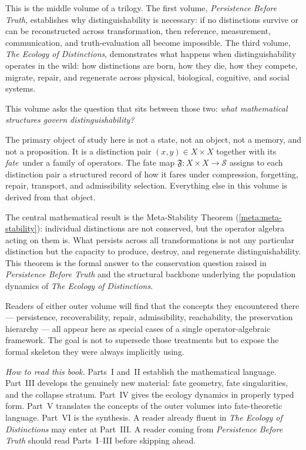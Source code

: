 \documentclass[12pt,twoside,openright]{book}
\newcommand{\distPairs}{X\times X}
\newcommand{\fateMap}{\mathfrak{F}}
\newcommand{\fateSpace}{\mathcal{S}}
\begin{document}
This is the middle volume of a trilogy. The first volume,
\textit{Persistence Before Truth}, establishes why distinguishability
is necessary: if no distinctions survive or can be reconstructed
across transformation, then reference, measurement, communication,
and truth-evaluation all become impossible. The third volume,
\textit{The Ecology of Distinctions}, demonstrates what happens
when distinguishability operates in the wild: how distinctions
are born, how they die, how they compete, migrate, repair, and
regenerate across physical, biological, cognitive, and social
systems.

This volume asks the question that sits between those two:
\emph{what mathematical structures govern distinguishability?}

The primary object of study here is not a state, not an object,
not a memory, and not a proposition. It is a distinction pair
$(x,y)\in X\times X$ together with its \emph{fate}\ under
a family of operators. The fate map
$\fateMap:\distPairs\to\fateSpace$
assigns to each distinction pair a structured record of how it
fares under compression, forgetting, repair, transport, and
admissibility selection. Everything else in this volume is derived
from that object.

The central mathematical result is the Meta-Stability Theorem
(\cref{meta:meta-stability}): individual distinctions are not
conserved, but the operator algebra acting on them is. What
persists across all transformations is not any particular
distinction but the capacity to produce, destroy, and regenerate
distinguishability. This theorem is the formal answer to the
conservation question raised in \textit{Persistence Before
Truth\/} and the structural backbone underlying the population
dynamics of \textit{The Ecology of Distinctions}.

Readers of either outer volume will find that the concepts they
encountered there --- persistence, recoverability, repair,
admissibility, reachability, the preservation hierarchy --- all
appear here as special cases of a single operator-algebraic
framework. The goal is not to supersede those treatments but to
expose the formal skeleton they were always implicitly using.

\bigskip
\noindent\textit{How to read this book.}
Parts~I and~II establish the mathematical language. Part~III
develops the genuinely new material: fate geometry, fate
singularities, and the collapse stratum. Part~IV gives the
ecology dynamics in properly typed form. Part~V translates the
concepts of the outer volumes into fate-theoretic language.
Part~VI is the synthesis. A reader already fluent in
\textit{The Ecology of Distinctions\/} may enter at Part~III.
A reader coming from \textit{Persistence Before Truth\/} should
read Parts~I--III before skipping ahead.
\end{document}
